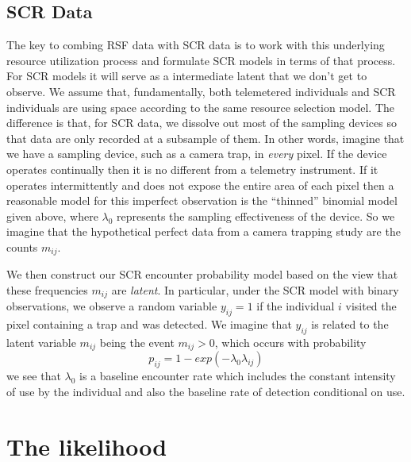 \subsection{SCR Data}

The key to combing RSF data with SCR data is to work with this
underlying resource utilization process and formulate SCR models in
terms of that process. For SCR models it will serve as a intermediate
latent that we don't get to observe. We assume that, fundamentally,
both telemetered individuals and SCR individuals are using space
according to the same resource selection model. The difference is that,
for SCR data, we dissolve out most of the sampling devices so that
data are only recorded at a subsample of them.
In other words, imagine that we have a sampling device, such as a
camera trap, in {\it every} pixel. If the device operates continually
then it is no different from a telemetry instrument. If it
operates  intermittently and does not expose the entire area of
each pixel then a reasonable model for this imperfect observation is
the ``thinned'' binomial model given above, where $\lambda_{0}$
represents the sampling effectiveness of the device. So we imagine
that the hypothetical perfect data from a camera trapping study are
the counts $m_{ij}$.

We then construct our SCR encounter probability model based on the
view that these frequencies $m_{ij}$ are {\it latent}. In particular,
under the SCR model with binary observations,
 we observe a random variable
$y_{ij} = 1$  if the individual $i$ visited the pixel
containing a trap and was detected.
We imagine that $y_{ij}$ is related to the latent variable $m_{ij}$ being the
event $m_{ij}>0$, which occurs with probability
\[
 p_{ij} = 1-exp(- \lambda_{0} \lambda_{ij})
\]
we see that $\lambda_{0}$ is a baseline encounter rate which includes
the constant intensity of use by the individual and also the baseline
rate of detection conditional on use.



\section{The likelihood}

